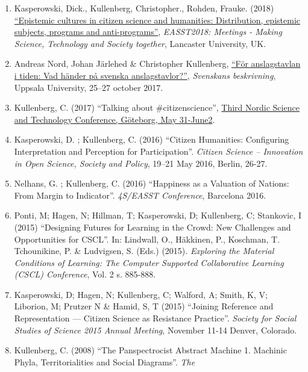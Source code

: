 \documentclass[
]{article}
\providecommand{\tightlist}{%
  \setlength{\itemsep}{0pt}\setlength{\parskip}{0pt}}
\begin{document}
\begin{enumerate}
\def\labelenumi{\arabic{enumi}.}
\tightlist
\item
  Kasperowski, Dick., Kullenberg, Christopher., Rohden, Frauke. (2018)
  \href{https://nomadit.co.uk/easst/easst2018/conferencesuite.php/panels/Views/All\%20Panels}{``Epistemic
  cultures in citizen science and humanities: Distribution, epistemic
  subjects, programs and anti-programs''}, \emph{EASST2018: Meetings -
  Making Science, Technology and Society together}, Lancaster
  University, UK.
\item
  Andreas Nord, Johan Järlehed \& Christopher Kullenberg,
  \href{http://www2.nordiska.uu.se/konferens/svebe36/sammandrag/nord-jarlehed-kullenberg/}{``För
  anslagstavlan i tiden: Vad händer på svenska anslagstavlor?''},
  \emph{Svenskans beskrivning}, Uppsala University, 25--27 october 2017.
\item
  Kullenberg, C. (2017) ``Talking about \#citizenscience'',
  \href{http://socav.gu.se/english/research/third-nordic-science-and-technology-studies-conference}{Third
  Nordic Science and Technology Conference, Göteborg, May 31-June2}.
\item
  Kasperowski, D. ; Kullenberg, C. (2016) ``Citizen Humanities:
  Configuring Interpretation and Perception for Participation''.
  \emph{Citizen Science -- Innovation in Open Science, Society and
  Policy}, 19--21 May 2016, Berlin, 26-27.
\item
  Nelhans, G. ; Kullenberg, C. (2016) ``Happiness as a Valuation of
  Nations: From Margin to Indicator''. \emph{4S/EASST Conference},
  Barcelona 2016.
\item
  Ponti, M; Hagen, N; Hillman, T; Kasperowski, D; Kullenberg, C;
  Stankovic, I (2015) ``Designing Futures for Learning in the Crowd: New
  Challenges and Opportunities for CSCL''. In: Lindwall, O., Häkkinen,
  P., Koschman, T. Tchounikine, P. \& Ludvigsen, S. (Eds.) (2015).
  \emph{Exploring the Material Conditions of Learning: The Computer
  Supported Collaborative Learning (CSCL) Conference}, Vol. 2 s.
  885-888.
\item
  Kasperowski, D; Hagen, N; Kullenberg, C; Walford, A; Smith, K, V;
  Liborion, M; Prutzer N \& Hamid, S, T (2015) ``Joining Reference and
  Representation --- Citizen Science as Resistance Practice''.
  \emph{Society for Social Studies of Science 2015 Annual Meeting},
  November 11-14 Denver, Colorado.
\item
  Kullenberg, C. (2008) ``The Panspectrocist Abstract Machine 1.
  Machinic Phyla, Territorialities and Social Diagrams''. \emph{The
}
\end{enumerate}
\end{document}
